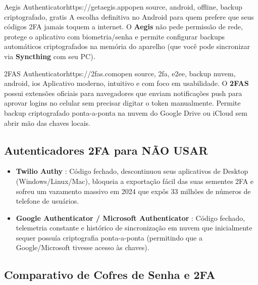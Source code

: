 \documentclass{pousadaguide}
\begin{document}
\begin{ferramenta}[goat,logo=aegis]{Aegis Authenticator}{https://getaegis.app}{open source, android, offline, backup criptografado, gratis}
A escolha definitiva no Android para quem prefere que seus códigos 2FA jamais toquem a internet. O \textbf{Aegis} não pede permissão de rede, protege o aplicativo com biometria/senha e permite configurar backups automáticos criptografados na memória do aparelho (que você pode sincronizar via \textbf{Syncthing} com seu PC). 
\end{ferramenta}

\begin{ferramenta}[recomendado,logo=2fas]{2FAS Authenticator}{https://2fas.com}{open source, 2fa, e2ee, backup nuvem, android, ios}
Aplicativo moderno, intuitivo e com foco em usabilidade. O \textbf{2FAS} possui extensões oficiais para navegadores que enviam notificações push para aprovar logins no celular sem precisar digitar o token manualmente. Permite backup criptografado ponta-a-ponta na nuvem do Google Drive ou iCloud sem abrir mão das chaves locais. 
\end{ferramenta}

\subsection{Autenticadores 2FA para NÃO USAR}

\begin{perigo}
\begin{itemize}
  \item \textbf{Twilio Authy} : Código fechado, descontinuou seus aplicativos de Desktop (Windows/Linux/Mac), bloqueia a exportação fácil das suas sementes 2FA e sofreu um vazamento massivo em 2024 que expôs 33 milhões de números de telefone de usuários.
  \item \textbf{Google Authenticator / Microsoft Authenticator} : Código fechado, telemetria constante e histórico de sincronização em nuvem que inicialmente sequer possuía criptografia ponta-a-ponta (permitindo que a Google/Microsoft tivesse acesso às chaves).
\end{itemize}
\end{perigo}

\subsection{Comparativo de Cofres de Senha e 2FA}
\end{document}
